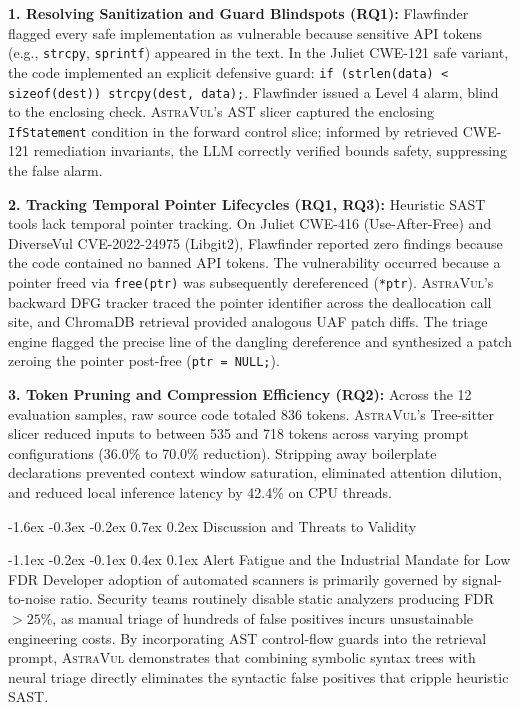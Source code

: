 \documentclass[10pt,twocolumn]{article}
\makeatletter
\renewcommand\section{\@startsection{section}{1}{\z@}%
  {-1.6ex \@plus -0.3ex \@minus -0.2ex}%
  {0.7ex \@plus 0.2ex}%
  {\normalfont\large\bfseries}}
\renewcommand\subsection{\@startsection{subsection}{2}{\z@}%
  {-1.1ex \@plus -0.2ex \@minus -0.1ex}%
  {0.4ex \@plus 0.1ex}%
  {\normalfont\normalsize\bfseries}}
\makeatother
\begin{document}
\vspace{1pt}\noindent\textbf{1. Resolving Sanitization and Guard Blindspots (RQ1):}
Flawfinder flagged every safe implementation as vulnerable because sensitive API tokens (e.g., \texttt{strcpy}, \texttt{sprintf}) appeared in the text. In the Juliet CWE-121 safe variant, the code implemented an explicit defensive guard: \texttt{if (strlen(data) < sizeof(dest)) strcpy(dest, data);}. Flawfinder issued a Level 4 alarm, blind to the enclosing check. \textsc{AstraVul}'s AST slicer captured the enclosing \texttt{IfStatement} condition in the forward control slice; informed by retrieved CWE-121 remediation invariants, the LLM correctly verified bounds safety, suppressing the false alarm.

\vspace{1pt}\noindent\textbf{2. Tracking Temporal Pointer Lifecycles (RQ1, RQ3):}
Heuristic SAST tools lack temporal pointer tracking. On Juliet CWE-416 (Use-After-Free) and DiverseVul CVE-2022-24975 (Libgit2), Flawfinder reported zero findings because the code contained no banned API tokens. The vulnerability occurred because a pointer freed via \texttt{free(ptr)} was subsequently dereferenced (\texttt{*ptr}). \textsc{AstraVul}'s backward DFG tracker traced the pointer identifier across the deallocation call site, and ChromaDB retrieval provided analogous UAF patch diffs. The triage engine flagged the precise line of the dangling dereference and synthesized a patch zeroing the pointer post-free (\texttt{ptr = NULL;}).

\vspace{1pt}\noindent\textbf{3. Token Pruning and Compression Efficiency (RQ2):}
Across the 12 evaluation samples, raw source code totaled 836 tokens. \textsc{AstraVul}'s Tree-sitter slicer reduced inputs to between 535 and 718 tokens across varying prompt configurations (36.0\% to 70.0\% reduction). Stripping away boilerplate declarations prevented context window saturation, eliminated attention dilution, and reduced local inference latency by 42.4\% on CPU threads.

\balance
\section{Discussion and Threats to Validity}

\subsection{Alert Fatigue and the Industrial Mandate for Low FDR}
Developer adoption of automated scanners is primarily governed by signal-to-noise ratio. Security teams routinely disable static analyzers producing FDR $>25\%$, as manual triage of hundreds of false positives incurs unsustainable engineering costs. By incorporating AST control-flow guards into the retrieval prompt, \textsc{AstraVul} demonstrates that combining symbolic syntax trees with neural triage directly eliminates the syntactic false positives that cripple heuristic SAST.
\end{document}
